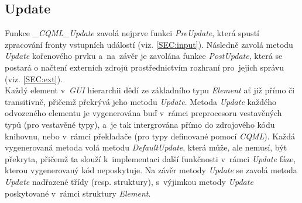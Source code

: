 \documentclass[11pt,twoside,a4paper]{book}
\begin{document}
\subsection{Update}
Funkce\textit{ \_CQML\_Update} zavolá nejprve funkci \textit{PreUpdate}, která spustí zpracování fronty vstupních událostí (viz. \ref{SEC:input}). Následně zavolá metodu \textit{Update} kořenového prvku a~na~závěr je zavolána funkce \textit{PostUpdate}, která se postará o načtení externích zdrojů prostřednictvím rozhraní pro~jejich správu (viz. \ref{SEC:ext}).\\
Každý element v~\textit{GUI} hierarchii dědí ze základního typu \textit{Element} ať již přímo či transitivně, přičemž překrývá jeho metodu \textit{Update}. Metoda \textit{Update} každého odvozeného elementu je vygenerována buď v~rámci preprocesoru vestavěných typů (pro vestavěné typy), a~je tak intergrována přímo do zdrojového kódu knihovnu, nebo v~rámci překladače (pro typy definované pomocí \textit{CQML}). Každá vygenerovaná metoda volá metodu \textit{DefaultUpdate}, která může, ale nemusí, být překryta, přičemž ta slouží k~implementaci další funkčnosti v~rámci \textit{Update} fáze, kterou vygenerovaný kód neposkytuje. Na závěr metody \textit{Update} se zavolá metoda \textit{Update} nadřazené třídy (resp. struktury), s~výjimkou metody \textit{Update} poskytované v~rámci struktury \textit{Element}.\\
\end{document}
